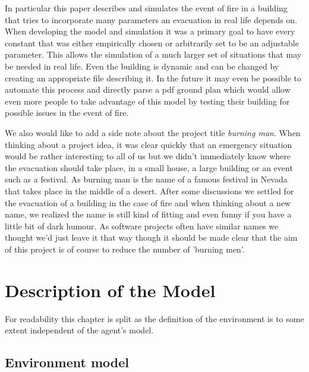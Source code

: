 \documentclass[11pt]{article}
\begin{document}
In particular this paper describes and simulates the event of fire in a building that tries to incorporate many parameters an evacuation in real life depends on. When developing the model and simulation it was a primary goal to have every constant that was either empirically chosen or arbitrarily set to be an adjustable parameter. This allows the simulation of a much larger set of situations that may be needed in real life. Even the building is dynamic and can be changed by creating an appropriate file describing it. In the future it may even be possible to automate this process and directly parse a pdf ground plan which would allow even more people to take advantage of this model by testing their building for possible issues in the event of fire.

We also would like to add a side note about the project title \textit{burning man}. When thinking about a project idea, it was clear quickly that an emergency situation would be rather interesting to all of us but we didn't immediately know where the evacuation should take place, in a small house, a large building or an event such as a festival. As burning man is the name of a famous festival in Nevada that takes place in the middle of a desert. After some discussions we settled for the evacuation of a building in the case of fire and when thinking about a new name, we realized the name is still kind of fitting and even funny if you have a little bit of dark humour. As software projects often have similar names we thought we'd just leave it that way though it should be made clear that the aim of this project is of course to reduce the number of 'burning men'.


\section{Description of the Model}

For readability this chapter is split as the definition of the environment is to some extent independent of the agent's model.

\subsection{Environment model}
\end{document}
